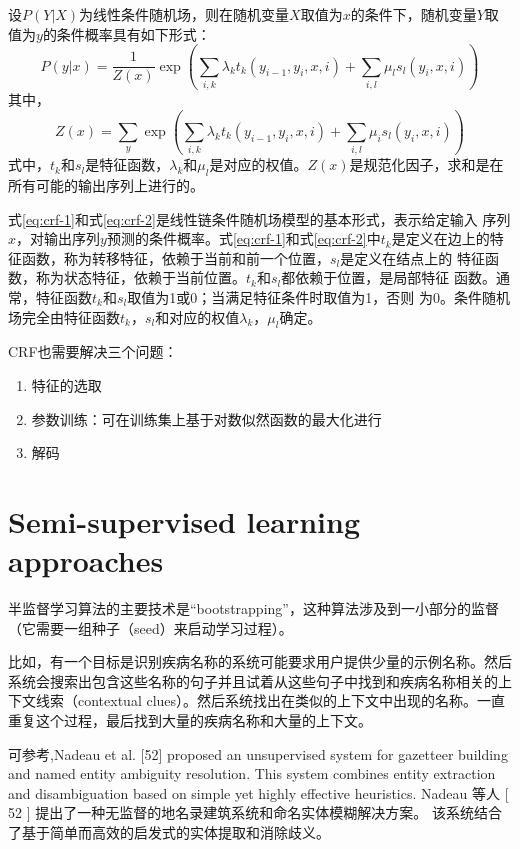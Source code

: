 \documentclass[a4paper,UTF8,no-math]{ctexart}
\begin{document}
	设$P(Y|X)$为线性条件随机场，则在随机变量$X$取值为$x$的条件下，随机变量$Y$取值为$y$的条件概率具有如下形式：\begin{equation}
P(y | x)=\frac{1}{Z(x)} \exp \left(\sum_{i, k} \lambda_{k} t_{k}\left(y_{i-1},y_{i}, x, i\right)+\sum_{i, l} \mu_{l} s_{l}\left(y_{i}, x, i\right)\right)
\label{eq:crf-1}
	\end{equation}
	其中，\begin{equation}
Z(x)=\sum_{y} \exp \left(\sum_{i, k} \lambda_{k} t_{k}\left(y_{i-1}, y_{i}, x, i\right)+\sum_{i, l} \mu_{i} s_{l}\left(y_{i}, x, i\right)\right)
\label{eq:crf-2}
	\end{equation}
	式中，$t_{k}$和$s_{l}$是特征函数，$\lambda_{k}$和$\mu_{l}$是对应的权值。$Z(x)$是规范化因子，求和是在所有可能的输出序列上进行的。
	
	式\eqref{eq:crf-1}和式\eqref{eq:crf-2}是线性链条件随机场模型的基本形式，表示给定输入
序列$x$，对输出序列$y$预测的条件概率。式\eqref{eq:crf-1}和式\eqref{eq:crf-2}中$t_{k}$是定义在边上的特征函数，称为转移特征，依赖于当前和前一个位置，$s_{l}$是定义在结点上的
特征函数，称为状态特征，依赖于当前位置。$t_{k}$和$s_{l}$都依赖于位置，是局部特征
函数。通常，特征函数$t_{k}$和$s_{l}$取值为1或0；当满足特征条件时取值为1，否则
为0。条件随机场完全由特征函数$t_{k}$，$s_{l}$和对应的权值$\lambda_{k}$，$\mu_{l}$确定。

	CRF也需要解决三个问题：
	\begin{enumerate}
		\item 特征的选取
		\item 参数训练：可在训练集上基于对数似然函数的最大化进行
		\item 解码
	\end{enumerate}
	
	\newpage
	
	\section{Semi-supervised learning approaches}
	
	半监督学习算法的主要技术是“bootstrapping”，这种算法涉及到一小部分的监督（它需要一组种子（seed）来启动学习过程）。
	
	比如，有一个目标是识别疾病名称的系统可能要求用户提供少量的示例名称。然后系统会搜索出包含这些名称的句子并且试着从这些句子中找到和疾病名称相关的上下文线索（contextual clues）。然后系统找出在类似的上下文中出现的名称。一直重复这个过程，最后找到大量的疾病名称和大量的上下文。
	
	可参考\citep{nadeau2006unsupervised},Nadeau et al. [52] proposed an unsupervised system for
	gazetteer building and named entity ambiguity resolution.
	This system combines entity extraction and disambiguation
	based on simple yet highly effective heuristics.
	Nadeau 等人 [ 52 ] 提出了一种无监督的地名录建筑系统和命名实体模糊解决方案。 该系统结合了基于简单而高效的启发式的实体提取和消除歧义。
	
\end{document}
